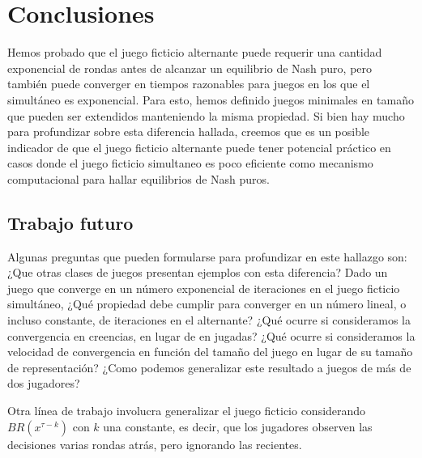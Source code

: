 \chapter{Conclusiones}  \label{cap:conclusiones} 

Hemos probado que el juego ficticio alternante puede requerir una cantidad exponencial de rondas antes de alcanzar un equilibrio de Nash puro, pero también puede converger en tiempos razonables para juegos en los que el simultáneo es exponencial. Para esto, hemos definido juegos minimales en tamaño que pueden ser extendidos manteniendo la misma propiedad.
Si bien hay mucho para profundizar sobre esta diferencia hallada, creemos que es un posible indicador de que el juego ficticio alternante puede tener potencial práctico en casos donde el juego ficticio simultaneo es poco eficiente como mecanismo computacional para hallar equilibrios de Nash puros.

\section{Trabajo futuro} 

Algunas preguntas que pueden formularse para profundizar en este hallazgo son: ¿Que otras clases de juegos presentan ejemplos con esta diferencia? Dado un juego que converge en un número exponencial de iteraciones en el juego ficticio simultáneo, ¿Qué propiedad debe cumplir para converger en un número lineal, o incluso constante, de iteraciones en el alternante? ¿Qué ocurre si consideramos la convergencia en creencias, en lugar de en jugadas? ¿Qué ocurre si consideramos la velocidad de convergencia en función del tamaño del juego en lugar de su tamaño de representación? ¿Como podemos generalizar este resultado a juegos de más de dos jugadores?

Otra línea de trabajo involucra generalizar el juego ficticio considerando $BR(x^{\tau-k})$ con $k$ una constante, es decir, que los jugadores observen las decisiones varias rondas atrás, pero ignorando las recientes.